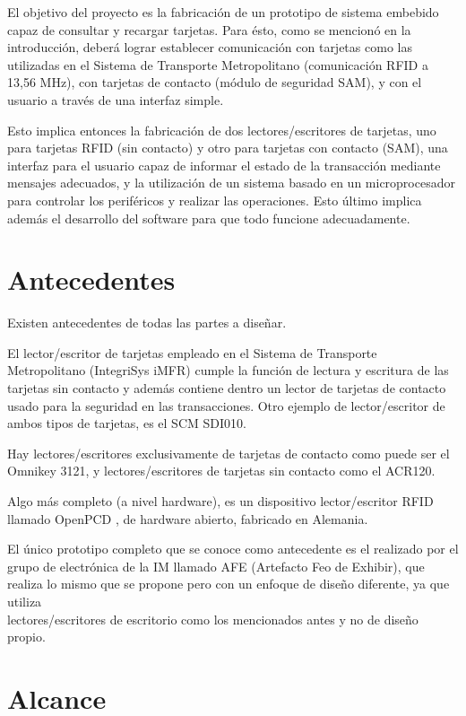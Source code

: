 El objetivo del proyecto es la fabricación de un prototipo de sistema embebido capaz de consultar y recargar tarjetas. Para ésto, como se mencionó en la introducción, deberá lograr establecer comunicación con tarjetas  como las utilizadas en el Sistema de Transporte Metropolitano (comunicación RFID a 13,56 MHz), con tarjetas de contacto (módulo de seguridad SAM), y con el usuario a través de una interfaz simple.

\bigskip
Esto implica entonces la fabricación de dos lectores/escritores de tarjetas, uno para tarjetas RFID (sin contacto) y otro para tarjetas con contacto (SAM), una interfaz para el usuario capaz de informar el estado de la transacción mediante mensajes adecuados, y la utilización de un sistema basado en un microprocesador para controlar los periféricos y realizar las operaciones. Esto último implica además el desarrollo del software para que todo funcione adecuadamente.


\section{Antecedentes}

Existen antecedentes de todas las partes a diseñar.

\bigskip
El lector/escritor de tarjetas empleado en el Sistema de Transporte Metropolitano (IntegriSys iMFR) cumple la función de lectura y escritura de las tarjetas sin contacto y además contiene dentro un lector de tarjetas de contacto usado para la seguridad en las transacciones. Otro ejemplo de lector/escritor de ambos tipos de tarjetas,  es el SCM SDI010.

\bigskip
Hay lectores/escritores exclusivamente de tarjetas de contacto como puede ser el Omnikey 3121, y lectores/escritores de tarjetas sin contacto como el ACR120.

\bigskip
Algo más completo (a nivel hardware), es un dispositivo lector/escritor RFID llamado OpenPCD \cite{OpenPCD}, de hardware abierto, fabricado en Alemania.

\bigskip
El único prototipo completo que se conoce como antecedente es el realizado por el grupo de electrónica de la IM llamado AFE (Artefacto Feo de Exhibir), que realiza lo mismo que se propone pero con un enfoque de diseño diferente, ya que utiliza \\
lectores/escritores de escritorio como los mencionados antes y no de diseño propio.


\section{Alcance}

